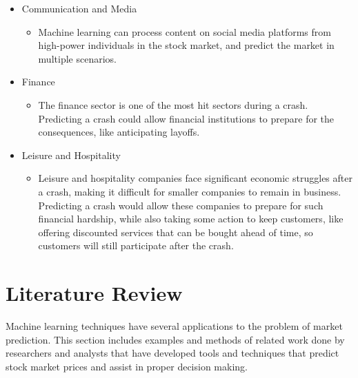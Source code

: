 \documentclass{article}
\begin{document}
\newpage
	\begin{itemize}
		\item Communication and Media
			\begin{itemize}
				\item Machine learning can process content on social media platforms from high-power individuals in the stock market, and predict the market in multiple scenarios.   
			\end{itemize}
		\item Finance
			\begin{itemize}
				\item The finance sector is one of the most hit sectors during a crash. Predicting a crash could allow financial institutions to prepare for the consequences, like anticipating layoffs.
			\end{itemize}
		\item Leisure and Hospitality 
			\begin{itemize}
				\item Leisure and hospitality companies face significant economic struggles after a crash, making it difficult for smaller companies to remain in business. Predicting a crash would allow these companies to prepare for such financial hardship, while also taking some action to keep customers, like offering discounted services that can be bought ahead of time, so customers will still participate after the crash. 
			\end{itemize}
	\end{itemize}
 
\section{Literature Review} 
Machine learning techniques have several applications to the problem of market prediction. This section includes examples and methods of related work done by researchers and analysts that have developed tools and techniques that predict stock market prices and assist in proper decision making.
\end{document}

